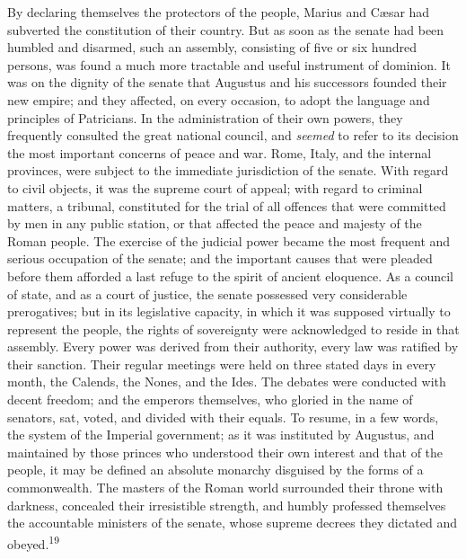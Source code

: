 

By declaring themselves the protectors of the people, Marius and
Cæsar had subverted the constitution of their country. But as
soon as the senate had been humbled and disarmed, such an
assembly, consisting of five or six hundred persons, was found a
much more tractable and useful instrument of dominion. It was on
the dignity of the senate that Augustus and his successors
founded their new empire; and they affected, on every occasion,
to adopt the language and principles of Patricians. In the
administration of their own powers, they frequently consulted the
great national council, and \textit{seemed} to refer to its decision the
most important concerns of peace and war. Rome, Italy, and the
internal provinces, were subject to the immediate jurisdiction of
the senate. With regard to civil objects, it was the supreme
court of appeal; with regard to criminal matters, a tribunal,
constituted for the trial of all offences that were committed by
men in any public station, or that affected the peace and majesty
of the Roman people. The exercise of the judicial power became
the most frequent and serious occupation of the senate; and the
important causes that were pleaded before them afforded a last
refuge to the spirit of ancient eloquence. As a council of state,
and as a court of justice, the senate possessed very considerable
prerogatives; but in its legislative capacity, in which it was
supposed virtually to represent the people, the rights of
sovereignty were acknowledged to reside in that assembly. Every
power was derived from their authority, every law was ratified by
their sanction. Their regular meetings were held on three stated
days in every month, the Calends, the Nones, and the Ides. The
debates were conducted with decent freedom; and the emperors
themselves, who gloried in the name of senators, sat, voted, and
divided with their equals. To resume, in a few words, the system
of the Imperial government; as it was instituted by Augustus, and
maintained by those princes who understood their own interest and
that of the people, it may be defined an absolute monarchy
disguised by the forms of a commonwealth. The masters of the
Roman world surrounded their throne with darkness, concealed
their irresistible strength, and humbly professed themselves the
accountable ministers of the senate, whose supreme decrees they
dictated and obeyed.\textsuperscript{19}

